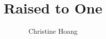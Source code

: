 \documentclass{article}
\title{Raised to One}
\author{Christine Hoang}
\begin{document}
\maketitle

\section{}
\end{document}
